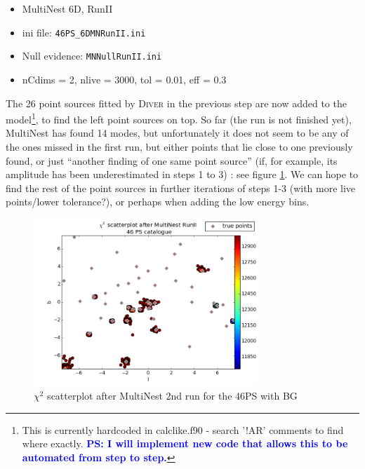 \documentclass{article}
\newcommand{\ps}[1]{\textcolor{blue}{{\bf PS: #1}}}
\begin{document}
\begin{itemize}
\item MultiNest 6D, RunII
\item ini file: \verb=46PS_6DMNRunII.ini=
\item Null evidence: \verb=MNNullRunII.ini=
\item nCdims = 2, nlive = 3000, tol = 0.01, eff = 0.3
\end{itemize}
The 26 point sources fitted by \textsc{Diver} in the previous step are now added to the model\footnote{This is currently 
hardcoded in calclike.f90 - search '!AR' comments to find where exactly. \ps{I will implement new code that allows this 
to be automated from step to step.}}, to find the left point sources on top. So far (the run is not finished yet), MultiNest 
has found 14 modes, but unfortunately it does not seem to be any of the ones missed in the first run, but either points 
that lie close to one previously found, or just ``another finding of one same point source'' (if, for example, its amplitude 
has been underestimated in steps 1 to 3) : see figure \ref{fig:scatterplot46PSMNII}. We can hope to find the rest of the 
point sources in further iterations of steps 1-3 (with more live points/lower tolerance?), or perhaps when adding the low 
energy bins.
\begin{figure}[h]
\centering
\includegraphics[clip = true,width=0.75\textwidth]{figs/scatplt46PSafterMNRunII.png}
\caption{$\chi^{2}$ scatterplot after MultiNest 2nd run for the 46PS with BG\label{fig:scatterplot46PSMNII}}
\end{figure}
\FloatBarrier
\end{document}
